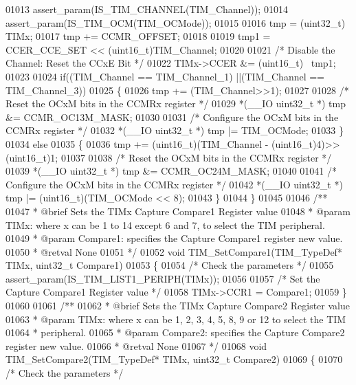 \begin{DoxyCode}
01013   assert_param(IS\_TIM\_CHANNEL(TIM\_Channel));
01014   assert_param(IS\_TIM\_OCM(TIM\_OCMode));
01015 
01016   tmp = (uint32\_t) TIMx;
01017   tmp += CCMR_OFFSET;
01018 
01019   tmp1 = CCER_CCE_SET << (uint16\_t)TIM\_Channel;
01020 
01021   \textcolor{comment}{/* Disable the Channel: Reset the CCxE Bit */}
01022   TIMx->CCER &= (uint16\_t) ~tmp1;
01023 
01024   \textcolor{keywordflow}{if}((TIM\_Channel == TIM_Channel_1) ||(TIM\_Channel == TIM_Channel_3))
01025   \{
01026     tmp += (TIM\_Channel>>1);
01027 
01028     \textcolor{comment}{/* Reset the OCxM bits in the CCMRx register */}
01029     *(\_\_IO uint32\_t *) tmp &= CCMR_OC13M_MASK;
01030 
01031     \textcolor{comment}{/* Configure the OCxM bits in the CCMRx register */}
01032     *(\_\_IO uint32\_t *) tmp |= TIM\_OCMode;
01033   \}
01034   \textcolor{keywordflow}{else}
01035   \{
01036     tmp += (uint16\_t)(TIM\_Channel - (uint16\_t)4)>> (uint16\_t)1;
01037 
01038     \textcolor{comment}{/* Reset the OCxM bits in the CCMRx register */}
01039     *(\_\_IO uint32\_t *) tmp &= CCMR_OC24M_MASK;
01040 
01041     \textcolor{comment}{/* Configure the OCxM bits in the CCMRx register */}
01042     *(\_\_IO uint32\_t *) tmp |= (uint16\_t)(TIM\_OCMode << 8);
01043   \}
01044 \}
01045 
01046 \textcolor{comment}{/**}
01047 \textcolor{comment}{  * @brief  Sets the TIMx Capture Compare1 Register value}
01048 \textcolor{comment}{  * @param  TIMx: where x can be 1 to 14 except 6 and 7, to select the TIM peripheral.}
01049 \textcolor{comment}{  * @param  Compare1: specifies the Capture Compare1 register new value.}
01050 \textcolor{comment}{  * @retval None}
01051 \textcolor{comment}{  */}
01052 \textcolor{keywordtype}{void} TIM_SetCompare1(TIM\_TypeDef* TIMx, uint32\_t Compare1)
01053 \{
01054   \textcolor{comment}{/* Check the parameters */}
01055   assert_param(IS\_TIM\_LIST1\_PERIPH(TIMx));
01056 
01057   \textcolor{comment}{/* Set the Capture Compare1 Register value */}
01058   TIMx->CCR1 = Compare1;
01059 \}
01060 
01061 \textcolor{comment}{/**}
01062 \textcolor{comment}{  * @brief  Sets the TIMx Capture Compare2 Register value}
01063 \textcolor{comment}{  * @param  TIMx: where x can be 1, 2, 3, 4, 5, 8, 9 or 12 to select the TIM }
01064 \textcolor{comment}{  *         peripheral.}
01065 \textcolor{comment}{  * @param  Compare2: specifies the Capture Compare2 register new value.}
01066 \textcolor{comment}{  * @retval None}
01067 \textcolor{comment}{  */}
01068 \textcolor{keywordtype}{void} TIM_SetCompare2(TIM\_TypeDef* TIMx, uint32\_t Compare2)
01069 \{
01070   \textcolor{comment}{/* Check the parameters */}

\end{DoxyCode}
